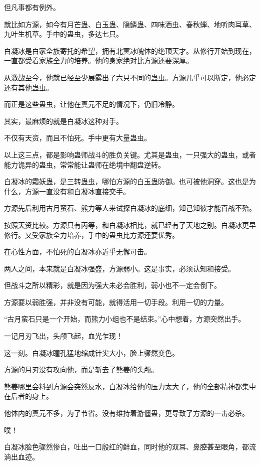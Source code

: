 \begin{this_body}
但凡事都有例外。

就比如方源，如今有月芒蛊、白玉蛊、隐鳞蛊、四味酒虫、春秋蝉、地听肉耳草、九叶生机草。手中的蛊虫，多达七只。

白凝冰是白家全族寄托的希望，拥有北冥冰魄体的绝顶天才。从修行开始到现在，一直都受着家族全力的培养。他的身家绝对比方源还要深厚。

从激战至今，他就已经至少展露出了六只不同的蛊虫。方源几乎可以断定，他必定还有其他蛊虫。

而正是这些蛊虫，让他在真元不足的情况下，仍旧冷静。

其实，最麻烦的就是白凝冰这种对手。

不仅有天资，而且不怕死。手中更有大量蛊虫。

以上这三点，都是影响蛊师战斗的胜负关键。尤其是蛊虫，一只强大的蛊虫，或者能力诡异的蛊虫，常常能让蛊师在绝境中翻盘逆转。

白凝冰的霜妖蛊，是三转蛊虫，哪怕方源的白玉蛊防御。也可被他洞穿。这也是为什么，方源一直没有和白凝冰直接交手。

方源先后利用古月蛮石、熊力等人来试探白凝冰的底细，知己知彼才能百战不殆。

按照天资比较。方源只有丙等，和白凝冰相比，就已经有了天地之别。白凝冰更早修行。又受家族全力培养，手中的蛊虫比方源还要优秀。

在心性方面，不怕死的白凝冰亦近乎无懈可击。

两人之间，本来就是白凝冰强盛，方源弱小。这是事实，必须认知和接受。

但战斗之所以精彩，就是因为强大未必会胜利，弱小也不一定会倒下。

方源要以弱胜强，并非没有可能，就得活用一切手段。利用一切的力量。

“古月蛮石只是一个开始，而熊力小组也不是结束。”心中想着，方源突然出手。

一记月刃飞出，头颅飞起，血光乍现！

这一刻。白凝冰瞳孔猛地缩成针尖大小，脸上骤然变色。

方源的月刃没有攻向他，而是斩去了熊姜的头颅。

熊姜哪里会料到方源会突然反水，白凝冰给他的压力太大了，他的全部精神都集中在后者的身上。

他体内的真元不多，为了节省。没有维持着游僵蛊，更导致了方源的一击必杀。

噗！

白凝冰脸色骤然惨白，吐出一口殷红的鲜血，同时他的双耳、鼻腔甚至眼角，都流淌出血迹。


\end{this_body}
